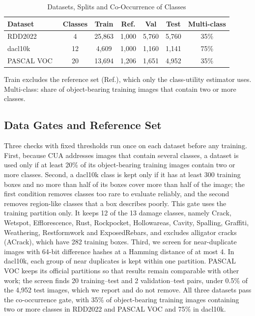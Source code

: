\documentclass[conference]{IEEEtran}
\begin{document}
\begin{table}[t]
\caption{Datasets, Splits and Co-Occurrence of Classes}
\label{tab:datasets}
\centering
\footnotesize
\setlength{\tabcolsep}{3pt}
\begin{tabular}{@{}lcccccc@{}}
\toprule
\textbf{Dataset} & \textbf{Classes} & \textbf{Train} & \textbf{Ref.} & \textbf{Val} & \textbf{Test} & \textbf{Multi-class} \\
\midrule
RDD2022~\cite{arya2024rdd} & 4 & 25,863 & 1,000 & 5,760 & 5,760 & 35\% \\
dacl10k~\cite{flotzinger2024dacl10k} & 12 & 4,609 & 1,000 & 1,160 & 1,141 & 75\% \\
PASCAL VOC~\cite{everingham2010voc} & 20 & 13,694 & 1,206 & 1,651 & 4,952 & 35\% \\
\bottomrule
\end{tabular}
\vspace{2pt}

\parbox{\columnwidth}{\footnotesize Train excludes the reference set (Ref.), which only the class-utility estimator uses. Multi-class: share of object-bearing training images that contain two or more classes.}
\end{table}

\subsection{Data Gates and Reference Set}
\label{sec:setup_gates}

Three checks with fixed thresholds run once on each dataset before any training. First, because CUA addresses images that contain several classes, a dataset is used only if at least 20\% of its object-bearing training images contain two or more classes. Second, a dacl10k class is kept only if it has at least 300 training boxes and no more than half of its boxes cover more than half of the image; the first condition removes classes too rare to evaluate reliably, and the second removes region-like classes that a box describes poorly. This gate uses the training partition only. It keeps 12 of the 13 damage classes, namely Crack, Wetspot, Efflorescence, Rust, Rockpocket, Hollowareas, Cavity, Spalling, Graffiti, Weathering, Restformwork and ExposedRebars, and excludes alligator cracks (ACrack), which have 282 training boxes. Third, we screen for near-duplicate images with 64-bit difference hashes at a Hamming distance of at most 4. In dacl10k, each group of near duplicates is kept within one partition. PASCAL VOC keeps its official partitions so that results remain comparable with other work; the screen finds 20 training--test and 2 validation--test pairs, under 0.5\% of the 4,952 test images, which we report and do not remove. All three datasets pass the co-occurrence gate, with 35\% of object-bearing training images containing two or more classes in RDD2022 and PASCAL VOC and 75\% in dacl10k.
\end{document}
